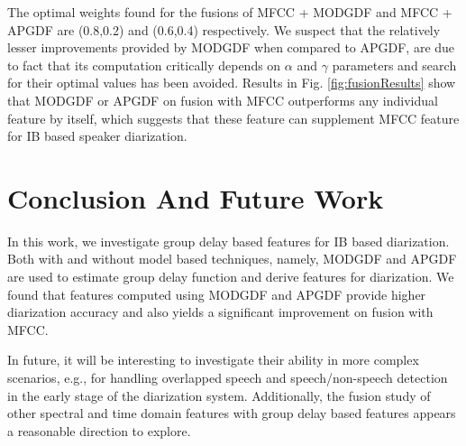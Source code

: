 \documentclass[conference]{IEEEtran}
\begin{document}
The optimal weights found for the fusions of MFCC + MODGDF and MFCC + APGDF are (0.8,0.2) and (0.6,0.4) respectively. We suspect that the relatively lesser
improvements provided by MODGDF when compared to APGDF, are due to fact that its
computation critically depends on $\alpha$ and $\gamma$ parameters and search
for their optimal values has been avoided.  Results in Fig.
\ref{fig:fusionResults} show that MODGDF or APGDF on fusion with MFCC
outperforms any individual feature by itself, which suggests that these
feature can supplement MFCC feature for IB based speaker diarization.

\section{Conclusion And Future Work}
\label{conclude}

In this work, we investigate group delay based features for IB based
diarization. Both with and without model based techniques, namely,
MODGDF and APGDF are used to estimate group delay function and derive features for diarization. 
We found that features computed using MODGDF and APGDF provide higher diarization accuracy and also yields a significant improvement on fusion with MFCC. 

In future, it will be interesting to investigate their ability in
more complex scenarios, e.g., for handling overlapped speech and speech/non-speech
detection in the early stage of the diarization system. Additionally, the fusion study of
other spectral and time domain features with group delay based features appears
a reasonable direction to explore. 



\end{document}
